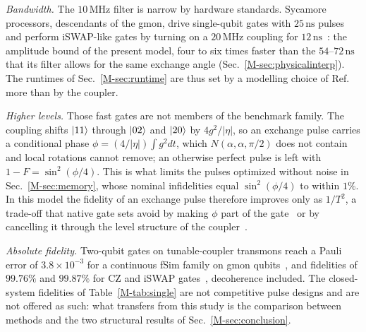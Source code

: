 \documentclass[aps,prx,twocolumn,superscriptaddress,nofootinbib,amsmath,amssymb,floatfix]{revtex4-2}
\newcommand{\Ntgt}[2]{N(#1,#1,#2)}
\newcommand{\ns}{\,\mathrm{ns}}
\newcommand{\MHz}{\,\mathrm{MHz}}
\begin{document}
\emph{Bandwidth.} The $10\MHz$ filter is narrow by hardware standards. Sycamore processors, descendants of
the gmon, drive single-qubit gates with $25\ns$ pulses and perform iSWAP-like gates by turning on a
$20\MHz$ coupling for $12\ns$~\cite{Arute2019}: the amplitude bound of the present model, four to six
times faster than the $54$--$72\ns$ that its filter allows for the same exchange angle
(Sec.~\ref{M-sec:physicalinterp}). The runtimes of Sec.~\ref{M-sec:runtime} are thus set by a modelling choice
of Ref.~\cite{Niu2019} more than by the coupler.

\emph{Higher levels.} Those fast gates are not members of the benchmark family. The coupling shifts
$\ket{11}$ through $\ket{02}$ and $\ket{20}$ by $4g^2/|\eta|$, so an exchange pulse carries a conditional
phase $\phi=(4/|\eta|)\int g^2dt$, which $\Ntgt{\alpha}{\pi/2}$ does not contain and local rotations
cannot remove; an otherwise perfect pulse is left with $1-F=\sin^2(\phi/4)$. This is what limits the
pulses optimized without noise in Sec.~\ref{M-sec:memory}, whose nominal infidelities equal
$\sin^2(\phi/4)$ to within $1\%$. In this model the fidelity of an exchange pulse therefore improves only
as $1/T^2$, a trade-off that native gate sets avoid by making $\phi$ part of the gate~\cite{Foxen2020} or
by cancelling it through the level structure of the coupler~\cite{Sung2021}.

\emph{Absolute fidelity.} Two-qubit gates on tunable-coupler transmons reach a Pauli error of
$3.8\times10^{-3}$ for a continuous fSim family on gmon qubits~\cite{Foxen2020}, and fidelities of
$99.76\%$ and $99.87\%$ for CZ and iSWAP gates~\cite{Sung2021}, decoherence included. The closed-system
fidelities of Table~\ref{M-tab:single} are not competitive pulse designs and are not offered as such: what
transfers from this study is the comparison between methods and the two structural results of
Sec.~\ref{M-sec:conclusion}.



\end{document}
